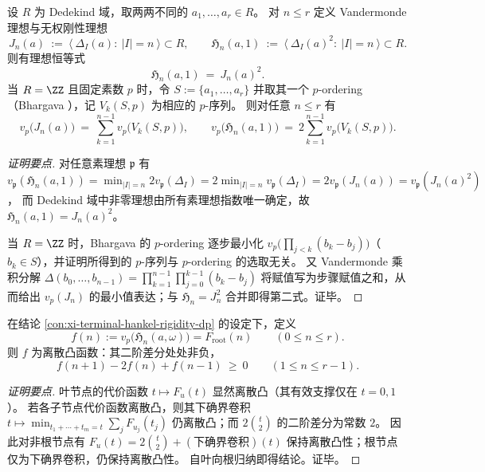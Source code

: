 \begin{conclusion}\label{con:xi-terminal-hankel-rigidity-unweighted-bhargava}
设 \(R\) 为 Dedekind 域，取两两不同的 \(a_1,\dots,a_r\in R\)。
对 \(n\le r\) 定义 Vandermonde 理想与无权刚性理想
\[
J_n(a)\ :=\ \big\langle\ \Delta_I(a):\ |I|=n\ \big\rangle\subset R,
\qquad
\mathfrak H_n(a,1)\ :=\ \big\langle\ \Delta_I(a)^2:\ |I|=n\ \big\rangle\subset R.
\]
则有理想恒等式
\[
\boxed{\;\mathfrak H_n(a,1)\ =\ J_n(a)^2.\;}
\]
当 \(R=\ZZ\) 且固定素数 \(p\) 时，令 \(S:=\{a_1,\dots,a_r\}\) 并取其一个 \(p\)-ordering（Bhargava \cite{Bhargava1997POrderings}），记 \(V_k(S,p)\) 为相应的 \(p\)-序列。
则对任意 \(n\le r\) 有
\[
v_p\bigl(J_n(a)\bigr)\ =\ \sum_{k=1}^{n-1} v_p\bigl(V_k(S,p)\bigr),
\qquad
v_p\bigl(\mathfrak H_n(a,1)\bigr)\ =\ 2\sum_{k=1}^{n-1} v_p\bigl(V_k(S,p)\bigr).
\]
\end{conclusion}
\begin{proof}[证明要点]
对任意素理想 \(\mathfrak p\) 有
\(
v_{\mathfrak p}(\mathfrak H_n(a,1))=\min_{|I|=n}2v_{\mathfrak p}(\Delta_I)
=2\min_{|I|=n}v_{\mathfrak p}(\Delta_I)
=2v_{\mathfrak p}(J_n(a))
=v_{\mathfrak p}(J_n(a)^2)
\)，
而 Dedekind 域中非零理想由所有素理想指数唯一确定，故 \(\mathfrak H_n(a,1)=J_n(a)^2\)。
\par
当 \(R=\ZZ\) 时，Bhargava 的 \(p\)-ordering 逐步最小化
\(
v_p\!\bigl(\prod_{j<k}(b_k-b_j)\bigr)
\)（\(b_k\in S\)），并证明所得到的 \(p\)-序列与 \(p\)-ordering 的选取无关。
又 Vandermonde 乘积分解
\(
\Delta(b_0,\dots,b_{n-1})=\prod_{k=1}^{n-1}\prod_{j=0}^{k-1}(b_k-b_j)
\)
将赋值写为步骤赋值之和，从而给出 \(v_p(J_n)\) 的最小值表达；与 \(\mathfrak H_n=J_n^2\) 合并即得第二式。证毕。
\end{proof}

\begin{conclusion}[刚性指数的离散凸性]\label{con:xi-terminal-hankel-rigidity-discrete-convexity}
在结论 \ref{con:xi-terminal-hankel-rigidity-dp} 的设定下，定义
\[
f(n):=v_p\!\bigl(\mathfrak H_n(a,\omega)\bigr)=F_{\mathrm{root}}(n)\qquad(0\le n\le r).
\]
则 \(f\) 为离散凸函数：其二阶差分处处非负，
\[
\boxed{\ f(n+1)-2f(n)+f(n-1)\ \ge\ 0\qquad(1\le n\le r-1).\ }
\]
\end{conclusion}
\begin{proof}[证明要点]
叶节点的代价函数 \(t\mapsto F_u(t)\) 显然离散凸（其有效支撑仅在 \(t=0,1\)）。
若各子节点代价函数离散凸，则其下确界卷积
\(
t\mapsto \min_{t_1+\cdots+t_m=t}\sum_j F_{u_j}(t_j)
\)
仍离散凸；而 \(2\binom{t}{2}\) 的二阶差分为常数 \(2\)。
因此对非根节点有
\(
F_u(t)=2\binom{t}{2}+(\text{下确界卷积})(t)
\)
保持离散凸性；根节点仅为下确界卷积，仍保持离散凸性。
自叶向根归纳即得结论。证毕。
\end{proof}

